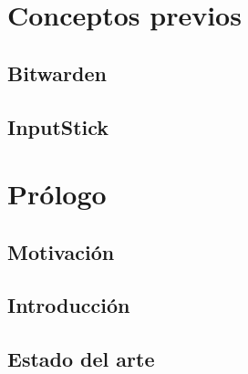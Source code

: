 \section{Conceptos previos}
\subsection{Bitwarden}

\subsection{InputStick}

\newpage
\section{Prólogo}
\subsection{Motivación}

\subsection{Introducción}

\subsection{Estado del arte}

\newpage
